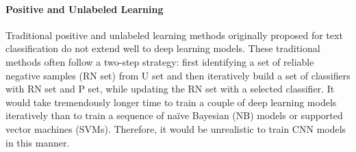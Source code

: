 


\paragraph{Positive and Unlabeled Learning}

Traditional positive and unlabeled learning methods originally proposed for text classification \cite{liu2003building,li2005learning} do not extend well to deep learning models.
These traditional methods often follow a two-step strategy: first identifying a set of reliable negative samples (RN set) from U set and then iteratively build a set of classifiers with RN set and P set, while updating the RN set with a selected classifier.
It would take tremendously longer time to train a couple of deep learning models iteratively than to train a sequence of na\"ive Bayesian (NB) models or supported vector machines (SVMs).
Therefore, it would be unrealistic to train CNN models in this manner.

